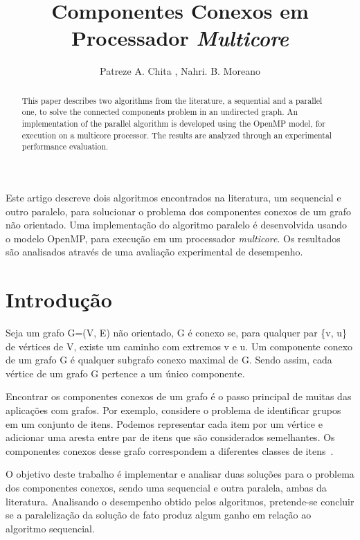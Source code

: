 \documentclass[12pt]{article}
\title{Componentes Conexos em Processador \emph{Multicore}}
\author{Patreze A. Chita \inst{1}, Nahri. B. Moreano\inst{1}}
\begin{document}
 

\maketitle

\begin{resumo} 
Este artigo descreve dois algoritmos encontrados na literatura, um sequencial e outro paralelo, para solucionar o problema dos componentes conexos de um grafo não orientado. Uma implementação do algoritmo paralelo é desenvolvida usando o modelo OpenMP, para execução em um processador \emph{multicore}. Os resultados são analisados através de uma avaliação experimental de desempenho.
\end{resumo}

\begin{abstract} 
This paper describes two algorithms from the literature, a sequential and a parallel one, to solve the connected components problem in an undirected graph. An implementation of the parallel algorithm is developed using the OpenMP model, for execution on a multicore processor. The results are analyzed through an experimental performance evaluation.
\end{abstract}

\section{Introdução}

Seja um grafo G=(V, E) não orientado, G é conexo se, para qualquer par \{v, u\} de vértices de V, existe um caminho com extremos v e u. Um componente conexo de um grafo G é qualquer subgrafo conexo maximal de G. Sendo assim, cada vértice de um grafo G pertence a um único componente.

Encontrar os componentes conexos de um grafo é o passo principal de muitas das aplicações com grafos. Por exemplo, considere o problema de identificar grupos em um conjunto de itens. Podemos representar cada item por um vértice e adicionar uma aresta entre par de itens que são considerados semelhantes. Os componentes conexos desse grafo correspondem a diferentes classes de itens~\cite{Skiena:2008}.

O objetivo deste trabalho é implementar e analisar duas soluções para o problema dos componentes conexos, sendo uma sequencial e outra paralela, ambas da literatura. Analisando o desempenho obtido pelos algoritmos, pretende-se concluir se a paralelização da solução de fato produz algum ganho em relação ao algoritmo sequencial.
\end{document}
